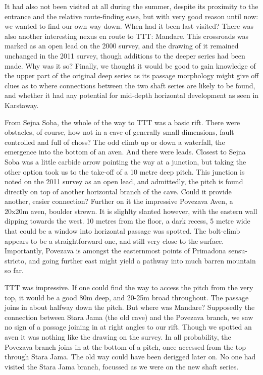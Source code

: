\documentclass[onecolumn]{book}
\begin{document}
It had also not been visited at all during the summer, despite its proximity to the entrance and the relative route-finding ease, but with very good reason until now: we wanted to find our own way down. When had it been last visited? There was also another interesting nexus en route to TTT: Mandare. This crossroads was marked as an open lead on the 2000 survey, and the drawing of it remained unchanged in the 2011 survey, though additions to the deeper series had been made. Why was it so? Finally, we thought it would be good to gain knowledge of the upper part of the original deep series as its passage morphology might give off clues as to where connections between the two shaft series are likely to be found, and whether it had any potential for mid-depth horizontal development as seen in Karstaway. 

From Sejna Soba, the whole of the way to TTT was a basic rift. There were obstacles, of course, how not in a cave of generally small dimensions, fault controlled and full of choss? The odd climb up or down a waterfall, the emergence into the bottom of an aven. And there were leads. Closest to Sejna Soba was a little carbide arrow pointing the way at a junction, but taking the other option took us to the take-off of a 10 metre deep pitch. This junction is noted on the 2011 survey as an open lead, and admittedly, the pitch is found directly on top of another horizontal branch of the cave. Could it provide another, easier connection? Further on it the impressive Povezava Aven, a 20x20m aven, boulder strewn. It is slighlty slanted however, with the eastern wall dipping towards the west. 10 metres from the floor, a dark recess, 5 metre wide  that could be a window into horizontal passage was spotted. The bolt-climb appears to be a straightforward one, and still very close to the surface. Importantly, Povezava is amongst the easternmost points of Primadona sensu-stricto, and going further east might yield a pathway into much barren mountain so far.

TTT was impressive. If one could find the way to access the pitch from the very top, it would be a good 80m deep, and 20-25m broad throughout. The passage joins in about halfway down the pitch. But where was Mandare? Supposedly the connection between Stara Jama (the old cave) and the Povezava branch, we saw no sign of a passage joining in at right angles to our rift. Though we spotted an aven it was nothing like the drawing on the survey. In all probability, the Povezava branch joins in at the bottom of a pitch, once accessed from the top through Stara Jama. The old way could have been derigged later on. No one had visited the Stara Jama branch, focussed as we were on the new shaft series. 
\end{document}
